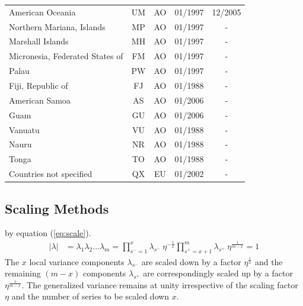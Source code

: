 \begin{small}
\begin{longtable}{p{7.5cm}cccc}
American Oceania	&	UM	&	AO	&	01/1997	&	12/2005	\\
Northern Mariana, Islands	&	MP	&	AO	&	01/1997	&	-	\\
Marshall Islands	&	MH	&	AO	&	01/1997	&	-	\\
Micronesia, Federated States of	&	FM	&	AO	&	01/1997	&	-	\\
Palau	&	PW	&	AO	&	01/1997	&	-	\\
Fiji, Republic of	&	FJ	&	AO	&	01/1988	&	-	\\
American Samoa	&	AS	&	AO	&	01/2006	&	-	\\
Guam	&	GU	&	AO	&	01/2006	&	-	\\
Vanuatu	&	VU	&	AO	&	01/1988	&	-	\\
Nauru	&	NR	&	AO	&	01/1988	&	-	\\
Tonga	&	TO	&	AO	&	01/1988	&	-	\\
Countries not specified	&	QX	&	EU	&	01/2002	&	-	\\
\end{longtable}
\end{small}

\subsection{Scaling Methods}
\label{subsec:scaling}
by equation (\ref{eq:scale}).
\begin{align}
	\label{eq:scale}
	|\lambda| &= \lambda_1 \lambda_2 \hdots \lambda_m
	= \prod_{s^- = 1}^{x} \lambda_{s^-}\ \eta^{-\frac{1}{x}}   \prod_{s^+ = x+1}^{m} \lambda_{s^+}\ \eta^{\frac{1}{m-x}} = 1
\end{align}
The $x$ local variance components $\lambda_{s^-}$ are scaled down by a factor $\eta^{\frac{1}{x}}$ and the remaining $(m-x)$ components $\lambda_{s^+}$ are correspondingly scaled up by a factor $\eta^{\frac{1}{m-x}}$. The generalized variance remains at unity irrespective of the scaling factor $\eta$ and the number of series to be scaled down $x$. 
